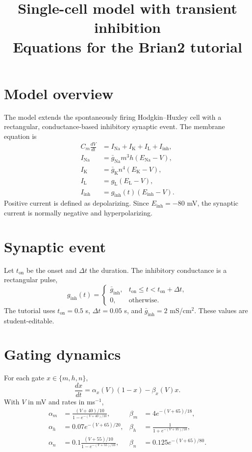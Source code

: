 \documentclass[11pt,a4paper]{article}
\title{Single-cell model with transient inhibition\\\large Equations for the Brian2 tutorial}
\author{}
\date{}
\begin{document}
\maketitle

\section*{Model overview}
The model extends the spontaneously firing Hodgkin--Huxley cell with a
rectangular, conductance-based inhibitory synaptic event. The membrane equation
is
\begin{align}
C_m\frac{dV}{dt} &= I_{\mathrm{Na}}+I_{\mathrm{K}}+I_{\mathrm{L}}+I_{\mathrm{inh}},\\
I_{\mathrm{Na}} &= \bar g_{\mathrm{Na}}m^3h(E_{\mathrm{Na}}-V),\\
I_{\mathrm{K}} &= \bar g_{\mathrm{K}}n^4(E_{\mathrm{K}}-V),\\
I_{\mathrm{L}} &= g_{\mathrm{L}}(E_{\mathrm{L}}-V),\\
I_{\mathrm{inh}} &= g_{\mathrm{inh}}(t)(E_{\mathrm{inh}}-V).
\end{align}
Positive current is defined as depolarizing. Since $E_{\mathrm{inh}}=-80$ mV,
the synaptic current is normally negative and hyperpolarizing.

\section*{Synaptic event}
Let $t_{\mathrm{on}}$ be the onset and $\Delta t$ the duration. The inhibitory
conductance is a rectangular pulse,
\begin{equation}
g_{\mathrm{inh}}(t)=
\begin{cases}
\bar g_{\mathrm{inh}}, & t_{\mathrm{on}}\le t<t_{\mathrm{on}}+\Delta t,\\
0, & \text{otherwise}.
\end{cases}
\end{equation}
The tutorial uses $t_{\mathrm{on}}=0.5$ s, $\Delta t=0.05$ s, and
$\bar g_{\mathrm{inh}}=2$ mS/cm$^2$. These values are student-editable.

\section*{Gating dynamics}
For each gate $x\in\{m,h,n\}$,
\begin{equation}
\frac{dx}{dt}=\alpha_x(V)(1-x)-\beta_x(V)x.
\end{equation}
With $V$ in mV and rates in ms$^{-1}$,
\begin{align}
\alpha_m&=\frac{(V+40)/10}{1-e^{-(V+40)/10}}, &
\beta_m&=4e^{-(V+65)/18},\\
\alpha_h&=0.07e^{-(V+65)/20}, &
\beta_h&=\frac{1}{1+e^{-(V+35)/10}},\\
\alpha_n&=0.1\frac{(V+55)/10}{1-e^{-(V+55)/10}}, &
\beta_n&=0.125e^{-(V+65)/80}.
\end{align}
\end{document}
